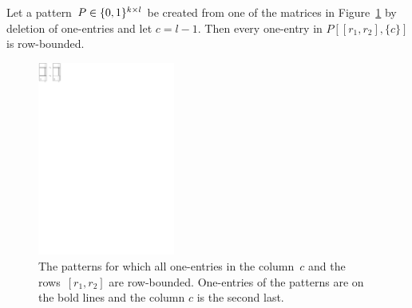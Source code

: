 \begin{lemma}
\label{lemma:I2}
Let a pattern~$P\in\{0,1\}^{k\times l}$ be created from one of the matrices in Figure~\ref{fig:lemmaI2} by deletion of one-entries and let $c=l-1$. Then every one-entry in $P[[r_1,r_2],\{c\}]$ is row-bounded.

\begin{figure}[!ht]
\centering
\includegraphics[width=45mm]{img/lemmaI2.pdf}
\caption{The patterns for which all one-entries in the column~$c$ and the rows~$[r_1,r_2]$ are row-bounded. One-entries of the patterns are on the bold lines and the column $c$ is the second last.}
\label{fig:lemmaI2}
\end{figure}
\end{lemma}
